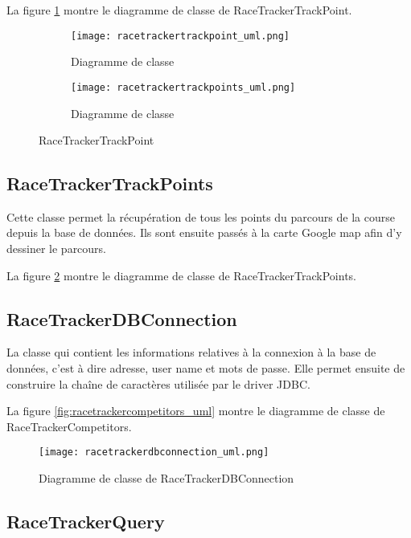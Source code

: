 La figure \ref{fig:racetrackertrackpoint_uml} montre le diagramme de classe de RaceTrackerTrackPoint.
 
 \begin{figure}[htb!]
    \centering
    \begin{subfigure}[htb]{1\textwidth}
		\texttt{[image: racetrackertrackpoint\_uml.png]} 
		\caption{Diagramme de classe}
		\label{fig:racetrackertrackpoint_uml}
    \end{subfigure}
    \begin{subfigure}[htb]{1\textwidth}
		\texttt{[image: racetrackertrackpoints\_uml.png]} 
		\caption{Diagramme de classe}
		\label{fig:racetrackertrackpoints_uml}
    \end{subfigure}
    \caption{RaceTrackerTrackPoint}\label{fig:racetrackertrackpoint_fig}
\end{figure}

\subsection{RaceTrackerTrackPoints}

Cette classe permet la récupération de tous les points du parcours de la course depuis la base de données. Ils sont ensuite passés à la carte Google map afin d'y dessiner le parcours.

La figure \ref{fig:racetrackertrackpoints_uml} montre le diagramme de classe de RaceTrackerTrackPoints.

\subsection{RaceTrackerDBConnection}

La classe qui contient les informations relatives à la connexion à la base de données, c'est à dire adresse, user name et mots de passe. Elle permet ensuite de construire la chaîne de caractères utilisée par le driver JDBC.

La figure \ref{fig:racetrackercompetitors_uml} montre le diagramme de classe de RaceTrackerCompetitors.

\begin{figure}[htb]
\centering 
\texttt{[image: racetrackerdbconnection\_uml.png]} 
\caption{Diagramme de classe de RaceTrackerDBConnection}
\label{fig:racetrackerdbconnection_uml}
 \end{figure}

\subsection{RaceTrackerQuery}

